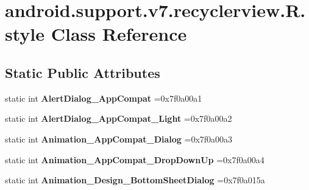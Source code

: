 \hypertarget{classandroid_1_1support_1_1v7_1_1recyclerview_1_1R_1_1style}{}\section{android.\+support.\+v7.\+recyclerview.\+R.\+style Class Reference}
\label{classandroid_1_1support_1_1v7_1_1recyclerview_1_1R_1_1style}
\subsection*{Static Public Attributes}
\begin{DoxyCompactItemize}
\item 
\mbox{\label{classandroid_1_1support_1_1v7_1_1recyclerview_1_1R_1_1style_a2dddb2059da7df555b365e044b2eca04}} 
static int {\bfseries Alert\+Dialog\+\_\+\+App\+Compat} =0x7f0a00a1
\item 
\mbox{\label{classandroid_1_1support_1_1v7_1_1recyclerview_1_1R_1_1style_a7f146bfe51e256d236a01b200bc9714b}} 
static int {\bfseries Alert\+Dialog\+\_\+\+App\+Compat\+\_\+\+Light} =0x7f0a00a2
\item 
\mbox{\label{classandroid_1_1support_1_1v7_1_1recyclerview_1_1R_1_1style_a2874ecb7ce097d2be9ba9c80459bd365}} 
static int {\bfseries Animation\+\_\+\+App\+Compat\+\_\+\+Dialog} =0x7f0a00a3
\item 
\mbox{\label{classandroid_1_1support_1_1v7_1_1recyclerview_1_1R_1_1style_ada87cabdae3db9de81ef649488539f09}} 
static int {\bfseries Animation\+\_\+\+App\+Compat\+\_\+\+Drop\+Down\+Up} =0x7f0a00a4
\item 
\mbox{\label{classandroid_1_1support_1_1v7_1_1recyclerview_1_1R_1_1style_ae02a7522b75d9d351e8e6413d989e3ca}} 
static int {\bfseries Animation\+\_\+\+Design\+\_\+\+Bottom\+Sheet\+Dialog} =0x7f0a015a
\item 
\mbox{\label{classandroid_1_1support_1_1v7_1_1recyclerview_1_1R_1_1style_a113e56d4f420ae21ddfcc7463ec6b8c8}} 

\end{DoxyCompactItemize}
